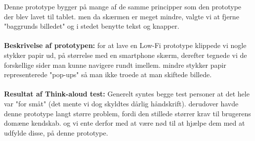 Denne prototype bygger på mange af de samme principper som den prototype der blev lavet til tablet. men da skærmen er meget mindre, valgte vi at fjerne "baggrunds billedet" og i stedet benytte tekst og knapper.\\\\ \textbf{Beskrivelse af prototypen:} for at lave en Low-Fi prototype klippede vi nogle stykker papir ud, på størrelse med en smartphone skærm, derefter tegnede vi de forskellige sider man kunne navigere rundt imellem. mindre stykker papir representerede "pop-ups" så man ikke troede at man skiftede billede.\\\\ \textbf{Resultat af Think-aloud test:} Generelt syntes begge test personer at det hele var "for småt" (det mente vi dog skyldtes dårlig håndskrift). derudover havde denne prototype langt større problem, fordi den stillede størrer krav til brugerens domæne kendskab. og vi ente derfor med at være nød til at hjælpe dem med at udfylde disse, på denne prototype.
